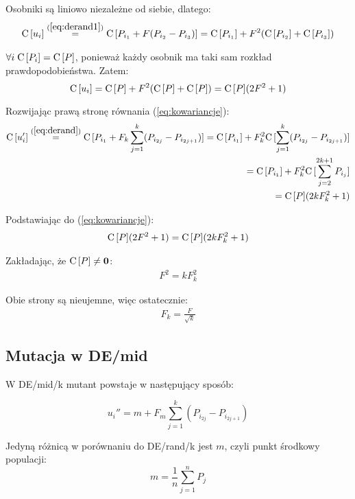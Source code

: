 Osobniki są liniowo niezależne od siebie, dlatego:
\begin{align*}
{\rm C}\,[u_i] \overset{(\ref{eq:derand1})}{=} {\rm C}\,[P_{i_1} + F(P_{i_2} - P_{i_3})] = {\rm C}\,[P_{i_1}] + F^2({\rm C}\,[P_{i_2}] + {\rm C}\,[P_{i_3}])
\end{align*}

$\forall{i}\hspace{1mm}{\rm C}\,[P_i] = {\rm C}\,[P]$, ponieważ każdy osobnik ma taki sam rozkład prawdopodobieństwa. Zatem:
\begin{equation} \label{eq:macierz_kow_mutanta}
{\rm C}\,[u_i] = {\rm C}\,[P] + F^2({\rm C}\,[P] + {\rm C}\,[P]) = {\rm C}\,[P](2F^2 + 1)
\end{equation}

Rozwijając prawą stronę równania (\ref{eq:kowariancje}):
\begin{align*}
{\rm C}\,[u_i'] \overset{(\ref{eq:derand})}{=} {\rm C}\,[P_{i_1} + F_k\sum\limits_{j=1}^k (P_{i_{2j}} - P_{i_{2j+1}})] 
= {\rm C}\,[P_{i_1}] + F_k^2{\rm C}\,[\sum\limits_{j=1}^k (P_{i_{2j}} - P_{i_{2j+1}})] \\
= {\rm C}\,[P_{i_1}] + F_k^2{\rm C}\,[\sum\limits_{j=2}^{2k+1} P_{i_{j}}] \\
= {\rm C}\,[P](2kF_k^2 + 1)
\end{align*}

Podstawiając do (\ref{eq:kowariancje}):
\begin{align*}
{\rm C}\,[P](2F^2 + 1) = {\rm C}\,[P](2kF_k^2 + 1)
\end{align*}

Zakładając, że ${\rm C}\,[P] \neq \textbf{0}$:
\begin{align*}
F^2 = kF_k^2
\end{align*}

Obie strony są nieujemne, więc ostatecznie:
\begin{align*}
F_k = \frac{F}{\sqrt{k}}
\end{align*}

\subsection{Mutacja w DE/mid}

W DE/mid/k mutant powstaje w następujący sposób:

\begin{equation} \label{eq:demid}
u_i'' = m + F_m\sum\limits_{j=1}^k (P_{i_{2j}} - P_{i_{2j+1}})
\end{equation}

Jedyną różnicą w porównaniu do DE/rand/k jest $m$, czyli punkt środkowy populacji:
\begin{equation} \label{eq:midpoint}
m = \frac{1}{n}\sum\limits_{j=1}^n P_j
\end{equation}

